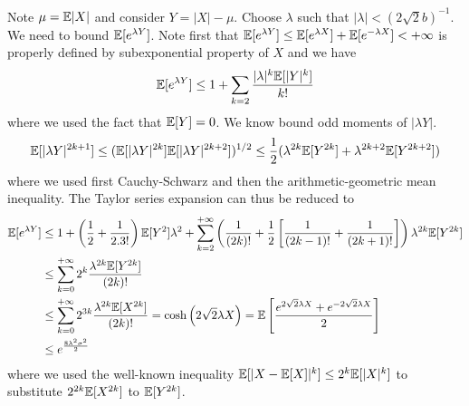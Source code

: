 \proofbegin
Note $\mu = \mathbb{E}|X|$ and consider $Y = |X| - \mu$. Choose $\lambda$ such that $|\lambda| < (2\sqrt{2}b)^{-1}$. We need to bound $\mathbb{E}[e^{\lambda Y}]$. Note first that $\mathbb{E}[e^{\lambda Y}] \leq \mathbb{E}[e^{\lambda X}] + \mathbb{E}[e^{-\lambda X}] < +\infty$ is properly defined by subexponential property of $X$ and we have
\[ 
\mathbb{E}[e^{\lambda Y}] \leq 1 + \sum_{k=2} \frac{|\lambda|^k\mathbb{E}[|Y|^k]}{k!} 
\]
where we used the fact that $\mathbb{E}[Y] = 0$. We know bound odd moments of $|\lambda Y|$. 
\[
\mathbb{E}[|\lambda Y|^{2k+1}] \leq (\mathbb{E}[|\lambda Y|^{2k}]\mathbb{E}[|\lambda Y|^{2k+2}])^{1/2} \leq \frac{1}{2} (\lambda^{2k} \mathbb{E}[Y^{2k}] + \lambda^{2k+2} \mathbb{E}[Y^{2k+2}])
\]
where we used first Cauchy-Schwarz and then the arithmetic-geometric mean inequality. The Taylor series expansion can thus be reduced to 
\begin{align*}
\Esp[e^{\lambda Y}] & \leq 1 + \left(\frac{1}{2} + \frac{1}{2.3!}\right) \Esp[Y^2] \lambda^2+ \sum_{k=2}^{+\infty} \left( \frac{1}{(2k)!} + \frac{1}{2}\left[ \frac{1}{(2k-1)!} + \frac{1}{(2k+1)!} \right] \right)\lambda^{2k} \Esp[Y^{2k}] \\ 
& \leq \sum_{k=0}^{+\infty} 2^k \frac{\lambda^{2k}\Esp[Y^{2k}]}{(2k)!} \\
&\leq \sum_{k=0}^{+\infty} 2^{3k} \frac{\lambda^{2k}\Esp[X^{2k}]}{(2k)!} =\cosh\left(2\sqrt{2}\lambda X\right) 
=\Esp\left[ \frac{e^{2\sqrt{2}\lambda X} + e^{-2\sqrt{2}\lambda X}}{2}\right]\\
& \leq e^{\frac{8\lambda^2\sigma^2}{2}}\\
\end{align*}
where we used the well-known inequality $\mathbb{E}[|X - \mathbb{E}[X]|^k] \leq 2^k \mathbb{E}[|X|^k]$ to substitute $2^{2k}\mathbb{E}[X^{2k}]$ to $\mathbb{E}[Y^{2k}]$.\\


\proofend


